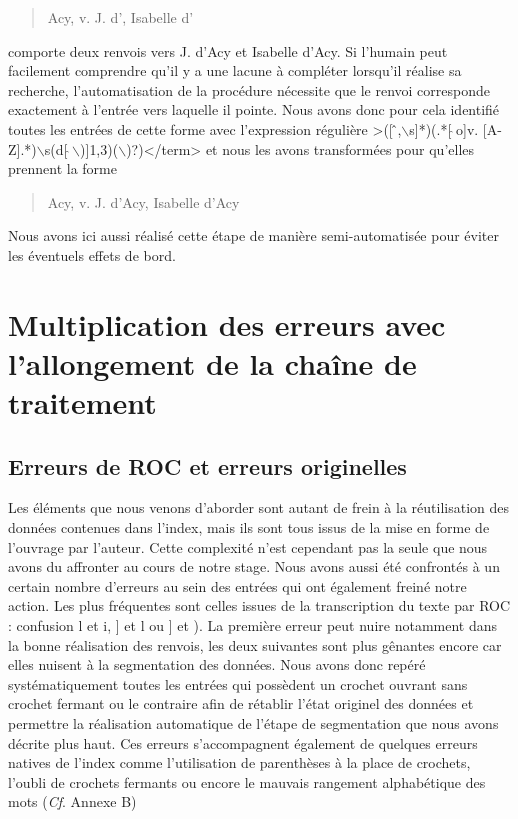 \documentclass[a4paper,12pt,twoside]{book}
\begin{document}
	\begin{quotation}
		Acy, v. J. d', Isabelle d'
	\end{quotation}

	\noindent comporte deux renvois vers \og J. d'Acy\fg{} et \og Isabelle d'Acy\fg{}. Si l'humain peut facilement comprendre qu'il y a une lacune à compléter lorsqu'il réalise sa recherche, l'automatisation de la procédure nécessite que le renvoi corresponde exactement à l'entrée vers laquelle il pointe. Nous avons donc pour cela identifié toutes les entrées de cette forme avec l'expression régulière \og >([\,\^\,,$\backslash$s]*)(.*[\,$\hat{}$\,o]v. [A-Z].*)$\backslash$s(d[\,$\hat{}$\,$\backslash$)]{1,3})($\backslash$)?)</term>\fg{} et nous les avons transformées pour qu'elles prennent la forme
	
	\begin{quotation}
		Acy, v. J. d'Acy, Isabelle d'Acy
	\end{quotation}

	\noindent Nous avons ici aussi réalisé cette étape de manière semi-automatisée pour éviter les éventuels effets de bord.
	
	\section{Multiplication des erreurs avec l’allongement de la chaîne de traitement}
	
	\subsection{Erreurs de ROC et erreurs originelles}
	
	Les éléments que nous venons d'aborder sont autant de frein à la réutilisation des données contenues dans l'index, mais ils sont tous issus de la mise en forme de l'ouvrage par l'auteur. Cette complexité n'est cependant pas la seule que nous avons du affronter au cours de notre stage. Nous avons aussi été confrontés à un certain nombre d'erreurs au sein des entrées qui ont également freiné notre action. Les plus fréquentes sont celles issues de la transcription du texte par ROC : confusion \og l\fg{} et \og i\fg{}, \og ]\fg{} et \og l\fg{} ou \og ]\fg{} et \og )\fg{}. La première erreur peut nuire notamment dans la bonne réalisation des renvois, les deux suivantes sont plus gênantes encore car elles nuisent à la segmentation des données. Nous avons donc repéré systématiquement toutes les entrées qui possèdent un crochet ouvrant sans crochet fermant ou le contraire afin de rétablir l'état originel des données et permettre la réalisation automatique de l'étape de segmentation que nous avons décrite plus haut. Ces erreurs s'accompagnent également de quelques erreurs natives de l'index comme l'utilisation de parenthèses à la place de crochets, l'oubli de crochets fermants ou encore le mauvais rangement alphabétique des mots (\textit{Cf}. Annexe B)
	
\end{document}
